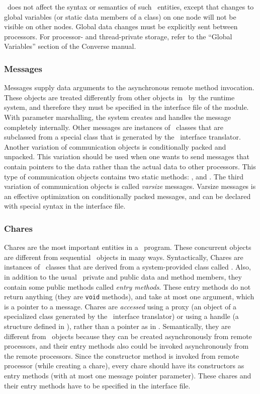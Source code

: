 \charmpp\ does not affect the syntax or semantics of such \CC\ entities,
except that changes to global variables (or static data members of a class)
on one node will not be visible on other nodes.  Global data changes
must be explicitly sent between processors.  For processor- and
thread-private storage, refer to the ``Global Variables'' section
of the Converse manual.


\subsubsection{Messages}

Messages supply data arguments to the asynchronous remote method invocation.
These objects are treated differently from other objects in \charmpp\ by the
runtime system, and therefore they must be specified in the interface file
of the module.  With parameter marshalling, the system creates and handles
the message completely internally. Other messages are instances of \CC\
classes that are subclassed from a special class that is generated by the
\charmpp\ interface translator.  Another variation of communication objects
is conditionally packed and unpacked. This variation should be used when one
wants to send messages that contain pointers to the data rather than the
actual data to other processors. This type of communication objects contains
two static methods: \kw{pack}, and \kw{unpack}. The third variation of
communication objects is called {\em varsize} messages. Varsize messages is
an effective optimization on conditionally packed messages, and can be
declared with special syntax in the interface file.

\subsubsection{Chares}

Chares are the most important entities in a \charmpp\ program. These concurrent
objects are different from sequential \CC\ objects in many ways. Syntactically,
Chares are instances of \CC\  classes that are derived from a system-provided
class called \kw{Chare}. Also, in addition to the usual \CC\ private and public
data and method members, they contain some public methods called {\em entry
methods}. These entry methods do not return anything (they are {\tt void}
methods), and take at most one argument, which is a pointer to a message.
Chares are {\em accessed} using a proxy (an object of a specialized class
generated by the \charmpp\ interface translator) or using a handle (a \kw{
CkChareID} structure defined in \charmpp), rather than a pointer as in \CC.
Semantically, they are different from \CC\ objects because they can be created
asynchronously from remote processors, and their entry methods also could be
invoked asynchronously from the remote processors. Since the constructor method
is invoked from remote processor (while creating a chare), every chare should
have its constructors as entry methods (with at most one message pointer
parameter). These chares and their entry methods have to be specified in the
interface file.

